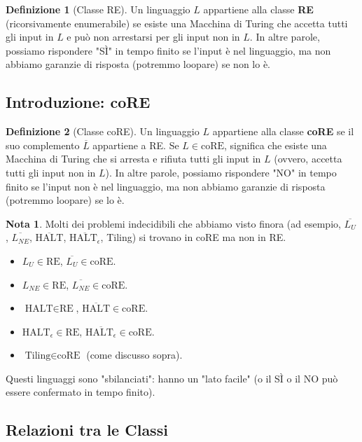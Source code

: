 \documentclass[a4paper]{article}
\theoremstyle{definition} %
\newtheorem{definition}{Definizione}
\newtheorem{remark}{Nota}
\begin{document}
\begin{definition}[Classe RE]
Un linguaggio $L$ appartiene alla classe \textbf{RE} (ricorsivamente enumerabile) se esiste una Macchina di Turing che accetta tutti gli input in $L$ e può non arrestarsi per gli input non in $L$. In altre parole, possiamo rispondere "SÌ" in tempo finito se l'input è nel linguaggio, ma non abbiamo garanzie di risposta (potremmo loopare) se non lo è.
\end{definition}

\subsection{Introduzione: coRE}
\begin{definition}[Classe coRE]
Un linguaggio $L$ appartiene alla classe \textbf{coRE} se il suo complemento $\overline{L}$ appartiene a RE.
Se $L \in \text{coRE}$, significa che esiste una Macchina di Turing che si arresta e rifiuta tutti gli input in $L$ (ovvero, accetta tutti gli input non in $L$). In altre parole, possiamo rispondere "NO" in tempo finito se l'input non è nel linguaggio, ma non abbiamo garanzie di risposta (potremmo loopare) se lo è.
\end{definition}

\begin{remark}
Molti dei problemi indecidibili che abbiamo visto finora (ad esempio, $\overline{L_U}$, $\overline{L_{NE}}$, $\overline{\text{HALT}}$, $\overline{\text{HALT}_\epsilon}$, Tiling) si trovano in coRE ma non in RE.
\begin{itemize}
    \item $L_U \in \text{RE}$, $\overline{L_U} \in \text{coRE}$.
    \item $L_{NE} \in \text{RE}$, $\overline{L_{NE}} \in \text{coRE}$.
    \item $\text{HALT} \in \text{RE}$, $\overline{\text{HALT}} \in \text{coRE}$.
    \item $\text{HALT}_\epsilon \in \text{RE}$, $\overline{\text{HALT}_\epsilon} \in \text{coRE}$.
    \item $\text{Tiling} \in \text{coRE}$ (come discusso sopra).
\end{itemize}
Questi linguaggi sono "sbilanciati": hanno un "lato facile" (o il SÌ o il NO può essere confermato in tempo finito).
\end{remark}

\subsection{Relazioni tra le Classi}
\end{document}
